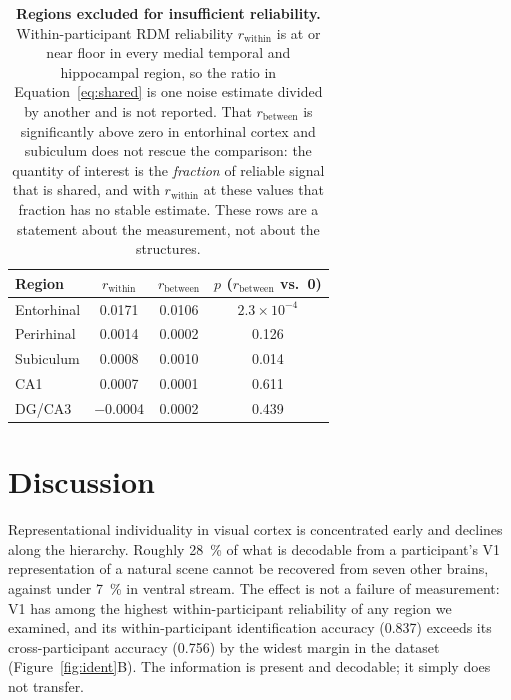 \documentclass[11pt,a4paper]{article}
\begin{document}
\begin{table}[tb]
\centering
\caption{\textbf{Regions excluded for insufficient reliability.}
Within-participant RDM reliability $r_{\mathrm{within}}$ is at or near floor in
every medial temporal and hippocampal region, so the ratio in
Equation~\ref{eq:shared} is one noise estimate divided by another and is not
reported. That $r_{\mathrm{between}}$ is significantly above zero in entorhinal
cortex and subiculum does not rescue the comparison: the quantity of interest is
the \emph{fraction} of reliable signal that is shared, and with
$r_{\mathrm{within}}$ at these values that fraction has no stable estimate. These
rows are a statement about the measurement, not about the structures.}
\label{tab:excluded}
\small
\begin{tabular}{lccc}
\toprule
Region & $r_{\mathrm{within}}$ & $r_{\mathrm{between}}$ & $p$ ($r_{\mathrm{between}}$ vs.\ 0) \\
\midrule
Entorhinal          & \num{0.0171} & \num{0.0106} & $2.3\times10^{-4}$ \\
Perirhinal          & \num{0.0014} & \num{0.0002} & 0.126 \\
Subiculum           & \num{0.0008} & \num{0.0010} & 0.014 \\
CA1                 & \num{0.0007} & \num{0.0001} & 0.611 \\
DG/CA3              & \num{-0.0004} & \num{0.0002} & 0.439 \\
\bottomrule
\end{tabular}
\end{table}

\clearpage

\section{Discussion}

Representational individuality in visual cortex is concentrated early and
declines along the hierarchy. Roughly \SI{28}{\percent} of what is decodable from
a participant's V1 representation of a natural scene cannot be recovered from
seven other brains, against under \SI{7}{\percent} in ventral stream. The effect
is not a failure of measurement: V1 has among the highest within-participant
reliability of any region we examined, and its within-participant identification
accuracy (\num{0.837}) exceeds its cross-participant accuracy (\num{0.756}) by
the widest margin in the dataset (Figure~\ref{fig:ident}B). The information is
present and decodable; it simply does not transfer.
\end{document}
